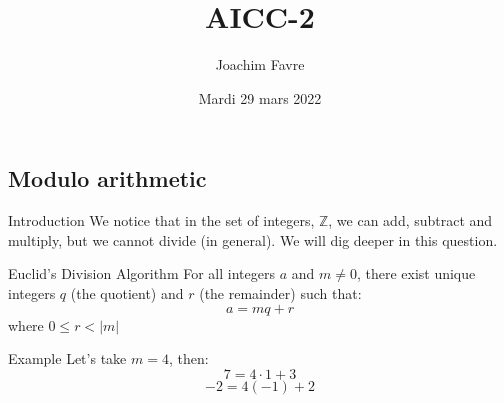 \documentclass[a4paper]{article}
\title{AICC-2}
\author{Joachim Favre}
\date{Mardi 29 mars 2022}
\begin{document}
\maketitle


\subsection{Modulo arithmetic}
\begin{parag}{Introduction}
    We notice that in the set of integers, $\mathbb{Z}$, we can add, subtract and multiply, but we cannot divide (in general). We will dig deeper in this question.
\end{parag}

\begin{parag}{Euclid's Division Algorithm}
    For all integers $a$ and $m \neq 0$, there exist unique integers $q$ (the quotient) and $r$ (the remainder) such that: 
    \[a = mq + r\]
    where $0 \leq r < \left|m\right|$
    
    \begin{subparag}{Example}
        Let's take $m = 4$, then:
        \[7 = 4\cdot 1 + 3\] 
        \[-2 = 4\left(-1\right) + 2\]
    \end{subparag}
\end{parag}
\end{document}
